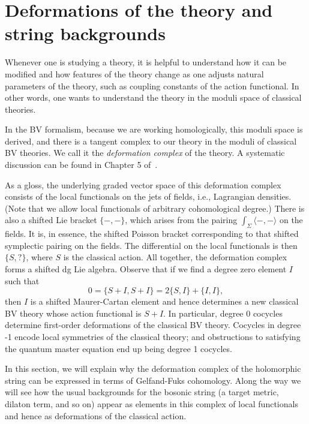 \section{Deformations of the theory and string backgrounds}




Whenever one is studying a theory,
it is helpful to understand how it can be modified 
and how features of the theory change as one adjusts natural parameters of the theory,
such as coupling constants of the action functional.
In other words, one wants to understand the theory in the moduli space of classical theories.

In the BV formalism, because we are working homologically, this moduli space is derived,
and there is a tangent complex to our theory in the moduli of classical BV theories.
We call it the {\em deformation complex} of the theory.
A systematic discussion can be found in Chapter 5 of~\cite{CosBook}.

As a gloss, the underlying graded vector space of this deformation complex consists of the local functionals on the jets of fields, i.e., Lagrangian densities.
(Note that we allow local functionals of arbitrary cohomological degree.) 
There is also a shifted Lie bracket $\{-,-\}$, 
which arises from the pairing $\int_\Sigma \langle-,-\rangle$ on the fields.
It is, in essence, the shifted Poisson bracket corresponding to that shifted symplectic pairing on the fields.
The differential on the local functionals is then $\{S,?\}$, where $S$ is the classical action. 
All together, the deformation complex forms a shifted dg Lie algebra. 
Observe that if we find a degree zero element $I$ such that
\[
0=\{S +I,S +I\}=2\{S,I\}+\{I,I\},
\]
then $I$ is a shifted Maurer-Cartan element and 
hence determines a new classical BV theory whose action functional is $S + I$. 
In particular, degree 0 cocycles determine first-order deformations of the classical BV theory. Cocycles in degree -1 encode local symmetries of the classical theory; 
and obstructions to satisfying the quantum master equation end up being degree 1 cocycles.

In this section, we will explain why the deformation complex of the holomorphic string 
can be expressed in terms of Gelfand-Fuks cohomology. 
Along the way we will see how the usual backgrounds for the bosonic string (a target metric, dilaton term, and so on) appear as elements in this complex of local functionals and hence as deformations of the classical action. 

